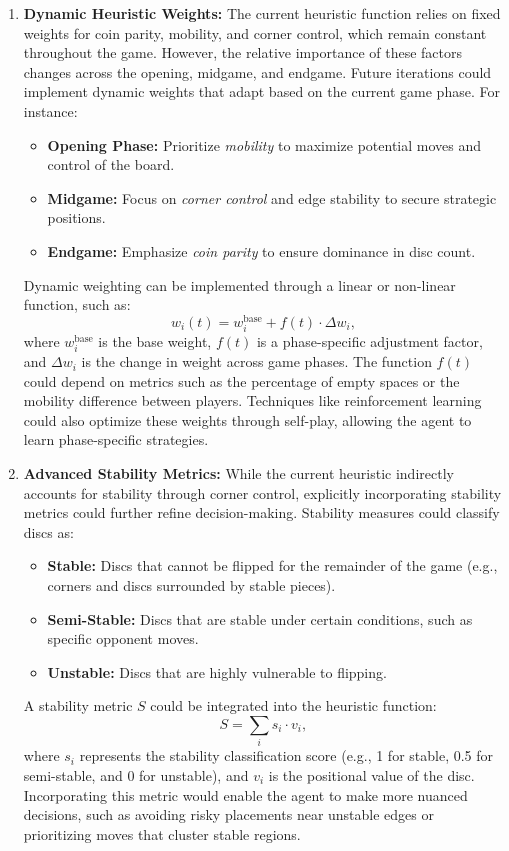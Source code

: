 \documentclass[11pt]{article}
\begin{document}
\begin{enumerate}
    \item \textbf{Dynamic Heuristic Weights:}
    The current heuristic function relies on fixed weights for coin parity, mobility, and corner control, which remain constant throughout the game. However, the relative importance of these factors changes across the opening, midgame, and endgame. Future iterations could implement dynamic weights that adapt based on the current game phase. For instance:
    \begin{itemize}
        \item \textbf{Opening Phase:} Prioritize \textit{mobility} to maximize potential moves and control of the board.
        \item \textbf{Midgame:} Focus on \textit{corner control} and edge stability to secure strategic positions.
        \item \textbf{Endgame:} Emphasize \textit{coin parity} to ensure dominance in disc count.
    \end{itemize}
    Dynamic weighting can be implemented through a linear or non-linear function, such as:
    \[
    w_i(t) = w_i^{\text{base}} + f(t) \cdot \Delta w_i,
    \]
    where \(w_i^{\text{base}}\) is the base weight, \(f(t)\) is a phase-specific adjustment factor, and \(\Delta w_i\) is the change in weight across game phases. The function \(f(t)\) could depend on metrics such as the percentage of empty spaces or the mobility difference between players. Techniques like reinforcement learning could also optimize these weights through self-play, allowing the agent to learn phase-specific strategies.

    \item \textbf{Advanced Stability Metrics:}
    While the current heuristic indirectly accounts for stability through corner control, explicitly incorporating stability metrics could further refine decision-making. Stability measures could classify discs as:
    \begin{itemize}
        \item \textbf{Stable:} Discs that cannot be flipped for the remainder of the game (e.g., corners and discs surrounded by stable pieces).
        \item \textbf{Semi-Stable:} Discs that are stable under certain conditions, such as specific opponent moves.
        \item \textbf{Unstable:} Discs that are highly vulnerable to flipping.
    \end{itemize}
    A stability metric \(S\) could be integrated into the heuristic function:
    \[
    S = \sum_{i} s_i \cdot v_i,
    \]
    where \(s_i\) represents the stability classification score (e.g., 1 for stable, 0.5 for semi-stable, and 0 for unstable), and \(v_i\) is the positional value of the disc. Incorporating this metric would enable the agent to make more nuanced decisions, such as avoiding risky placements near unstable edges or prioritizing moves that cluster stable regions.


\end{enumerate}
\end{document}
